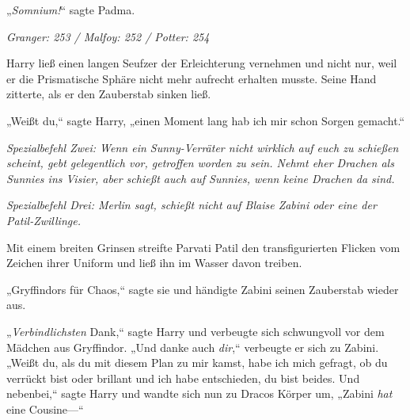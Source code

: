 „\emph{Somnium!}“ sagte Padma.

\later

\emph{Granger: 253 / Malfoy: 252 / Potter: 254}

Harry ließ einen langen Seufzer der Erleichterung vernehmen und nicht nur, weil er die Prismatische Sphäre nicht mehr aufrecht erhalten musste. Seine Hand zitterte, als er den Zauberstab sinken ließ.

„Weißt du,“ sagte Harry, „einen Moment lang hab ich mir schon Sorgen gemacht.“

\emph{Spezialbefehl Zwei: Wenn ein Sunny-Verräter nicht wirklich auf euch zu schießen scheint, gebt gelegentlich vor, getroffen worden zu sein. Nehmt eher Drachen als Sunnies ins Visier, aber schießt auch auf Sunnies, wenn keine Drachen da sind.}

\emph{Spezialbefehl Drei: Merlin sagt, schießt nicht auf Blaise Zabini oder eine der Patil-Zwillinge.}

Mit einem breiten Grinsen streifte Parvati Patil den transfigurierten Flicken vom Zeichen ihrer Uniform und ließ ihn im Wasser davon treiben.

„Gryffindors für Chaos,“ sagte sie und händigte Zabini seinen Zauberstab wieder aus.

„\emph{Verbindlichsten} Dank,“ sagte Harry und verbeugte sich schwungvoll vor dem Mädchen aus Gryffindor. „Und danke auch \emph{dir},“ verbeugte er sich zu Zabini. „Weißt du, als du mit diesem Plan zu mir kamst, habe ich mich gefragt, ob du verrückt bist oder brillant und ich habe entschieden, du bist beides. Und nebenbei,“ sagte Harry und wandte sich nun zu Dracos Körper um, „Zabini \emph{hat} eine Cousine—“

